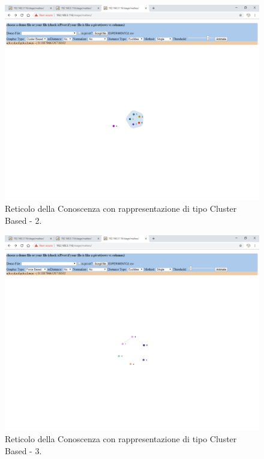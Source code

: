 \noindent
\begin{figure}[H]
\centering
	\includegraphics[width=1\linewidth]{./image/reticoloNonCorretto3.png}
	\caption{Reticolo della Conoscenza con rappresentazione di tipo Cluster Based - 2.}
	\label{Reticolo della Conoscenza con rappresentazione di tipo Cluster Based - 2.}
\end{figure}
\noindent
\begin{figure}[H]
\centering
	\includegraphics[width=1\linewidth]{./image/reticoloNonCorretto4.png}
	\caption{Reticolo della Conoscenza con rappresentazione di tipo Cluster Based - 3.}
	\label{Reticolo della Conoscenza con rappresentazione di tipo Cluster Based - 3.}
\end{figure}
